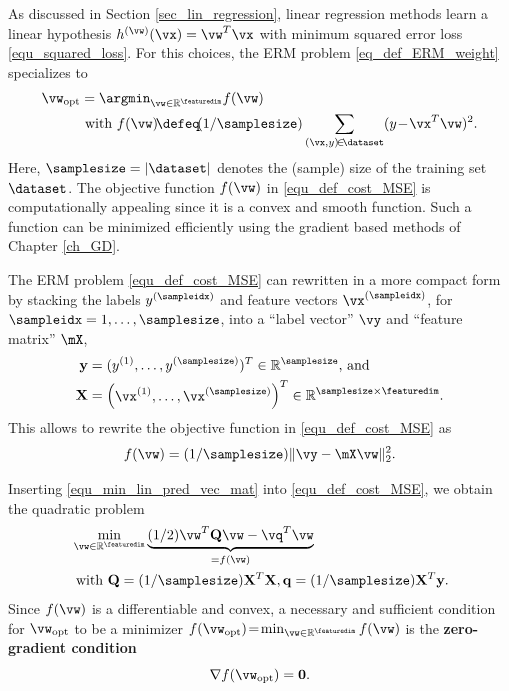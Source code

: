 \documentclass[12pt]{report}
\begin{document}
As discussed in Section \ref{sec_lin_regression}, linear regression methods 
learn a linear hypothesis $h^{(\vw)}(\vx) = \vw^{T} \vx$ with minimum squared 
error loss \eqref{equ_squared_loss}. For this choices, the ERM problem \eqref{eq_def_ERM_weight} 
specializes to  
\begin{align}
\label{equ_def_cost_MSE}
\vw_{\rm opt} & = \argmin_{\vw \in \mathbb{R}^{\featuredim}} f(\vw) \nonumber \\ 
& \mbox{ with } f(\vw)\!\defeq\!(1/\samplesize) \sum_{(\vx,y)\!\in\!\dataset} (y \!-\! \vx^{T} \vw )^2.
\end{align} 
Here, $\samplesize=|\dataset|$ denotes the (sample) size of the training set $\dataset$. 
The objective function $f(\vw)$ in \eqref{equ_def_cost_MSE} is computationally 
appealing since it is a convex and smooth function. Such a function can be minimized 
efficiently using the gradient based methods of Chapter \ref{ch_GD}. 

The ERM problem \eqref{equ_def_cost_MSE} can rewritten in a more compact form 
by stacking the labels $y^{(\sampleidx)}$ and feature vectors $\vx^{(\sampleidx)}$, for 
$\sampleidx=1,\ldots,\samplesize$, into a ``label vector'' $\vy$ and ``feature matrix'' $\mX$, 
\begin{align}
\label{equ_def_vec_matrix}
\mathbf{y} & = ( y^{(1)},\ldots, y^{(\samplesize)})^{T} \in \mathbb{R}^{\samplesize} \mbox{, and } \nonumber \\ 
\mathbf{X} & = \begin{pmatrix} \vx^{(1)},\ldots,\vx^{(\samplesize)} \end{pmatrix}^{T}\in \mathbb{R}^{\samplesize \times \featuredim}.
\end{align}
This allows to rewrite the objective function in \eqref{equ_def_cost_MSE} as 
\begin{equation}
\label{equ_min_lin_pred_vec_mat}
f(\vw) = (1/\samplesize) \| \vy - \mX\vw \|^{2}_{2}.
\end{equation} 

Inserting \eqref{equ_min_lin_pred_vec_mat} into \eqref{equ_def_cost_MSE}, 
we obtain the quadratic problem 
\begin{align}
\label{equ_quadr_form_linreg}
& \min_{\vw \in \mathbb{R}^{\featuredim}} \underbrace{(1/2) \vw^{T} \mathbf{Q} \vw - \vq^{T}  \vw}_{= f(\vw)} \nonumber \\
& \mbox{ with } \mathbf{Q}= (1/\samplesize) \mathbf{X}^{T} \mathbf{X}, \mathbf{q} =(1/\samplesize) \mathbf{X}^{T} \mathbf{y}. 
\end{align} 
Since $f(\vw)$ is a differentiable and convex, a necessary and sufficient condition for 
$\vw_{\rm opt}$ to be a minimizer $f(\vw_{\rm opt})\!=\!\min_{\vw \in \mathbb{R}^{\featuredim}} f(\vw)$ is the 
{\bf zero-gradient condition} \cite[Sec. 4.2.3]{BoydConvexBook}
\begin{equation}
\label{equ_zero_gradient}
 \nabla f(\vw_{\rm opt}) = \mathbf{0}.
\end{equation} 
\end{document}
